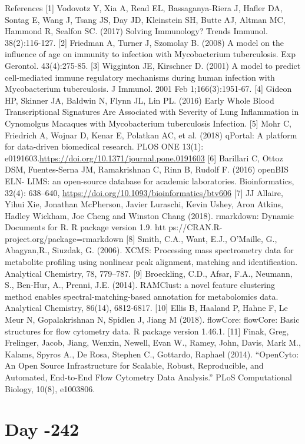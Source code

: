 \documentclass[]{book}
\begin{document}
References {[}1{]} Vodovotz Y, Xia A, Read EL, Bassaganya-Riera J,
Hafler DA, Sontag E, Wang J, Tsang JS, Day JD, Kleinstein SH, Butte AJ,
Altman MC, Hammond R, Sealfon SC. (2017) Solving Immunology? Trends
Immunol. 38(2):116-127. {[}2{]} Friedman A, Turner J, Szomolay B. (2008)
A model on the influence of age on immunity to infection with
Mycobacterium tuberculosis. Exp Gerontol. 43(4):275-85. {[}3{]}
Wigginton JE, Kirschner D. (2001) A model to predict cell-mediated
immune regulatory mechanisms during human infection with Mycobacterium
tuberculosis. J Immunol. 2001 Feb 1;166(3):1951-67. {[}4{]} Gideon HP,
Skinner JA, Baldwin N, Flynn JL, Lin PL. (2016) Early Whole Blood
Transcriptional Signatures Are Associated with Severity of Lung
Inflammation in Cynomolgus Macaques with Mycobacterium tuberculosis
Infection. {[}5{]} Mohr C, Friedrich A, Wojnar D, Kenar E, Polatkan AC,
et al. (2018) qPortal: A platform for data-driven biomedical research.
PLOS ONE 13(1):
e0191603.\url{https://doi.org/10.1371/journal.pone.0191603} {[}6{]}
Barillari C, Ottoz DSM, Fuentes-Serna JM, Ramakrishnan C, Rinn B, Rudolf
F. (2016) openBIS ELN- LIMS: an open-source database for academic
laboratories. Bioinformatics, 32(4): 638--640,
\url{https://doi.org/10.1093/bioinformatics/btv606} {[}7{]} JJ Allaire,
Yihui Xie, Jonathan McPherson, Javier Luraschi, Kevin Ushey, Aron
Atkins, Hadley Wickham, Joe Cheng and Winston Chang (2018). rmarkdown:
Dynamic Documents for R. R package version 1.9. htt
ps://CRAN.R-project.org/package=rmarkdown {[}8{]} Smith, C.A., Want,
E.J., O'Maille, G., Abagyan,R., Siuzdak, G. (2006). XCMS: Processing
mass spectrometry data for metabolite profiling using nonlinear peak
alignment, matching and identification. Analytical Chemistry, 78,
779--787. {[}9{]} Broeckling, C.D., Afsar, F.A., Neumann, S., Ben-Hur,
A., Prenni, J.E. (2014). RAMClust: a novel feature clustering method
enables spectral-matching-based annotation for metabolomics data.
Analytical Chemistry, 86(14), 6812-6817. {[}10{]} Ellis B, Haaland P,
Hahne F, Le Meur N, Gopalakrishnan N, Spidlen J, Jiang M (2018).
flowCore: flowCore: Basic structures for flow cytometry data. R package
version 1.46.1. {[}11{]} Finak, Greg, Frelinger, Jacob, Jiang, Wenxin,
Newell, Evan W., Ramey, John, Davis, Mark M., Kalams, Spyros A., De
Rosa, Stephen C., Gottardo, Raphael (2014). ``OpenCyto: An Open Source
Infrastructure for Scalable, Robust, Reproducible, and Automated,
End-to-End Flow Cytometry Data Analysis.'' PLoS Computational Biology,
10(8), e1003806.

\chapter{Day -242}\label{day--242}
\end{document}
